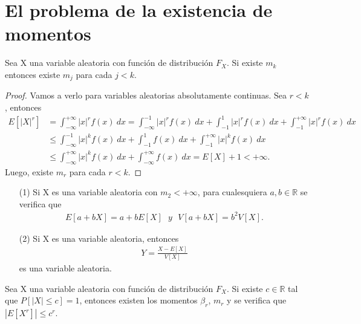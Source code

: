 \section{El problema de la existencia de momentos}

\begin{teo}
    Sea X una variable aleatoria con función de distribución $F_X$. Si existe $m_k$ entonces existe $m_j$ para cada $j < k$.
\end{teo}

\begin{proof}
    Vamos a verlo para variables aleatorias absolutamente continuas. Sea $r < k$, entonces
    \begin{align*}
        E[|X|^r] & = \int_{-\infty}^{+\infty}{|x|^rf(x) \ dx} = \int_{-\infty}^{-1}{|x|^rf(x) \ dx} + \int_{-1}^{1}{|x|^rf(x) \ dx} + \int_{-1}^{+\infty}{|x|^rf(x) \ dx} \\
                 & \leq \int_{-\infty}^{-1}{|x|^kf(x) \ dx} + \int_{-1}^{1}{f(x) \ dx} + \int_{-1}^{+\infty}{|x|^kf(x) \ dx}                                              \\
                 & \leq \int_{-\infty}^{+\infty}{|x|^kf(x) \ dx} + \int_{-\infty}^{+\infty}{f(x) \ dx} = E[X] + 1 < +\infty.
    \end{align*}
    Luego, existe $m_r$ para cada $r < k$.
\end{proof}

\begin{cor}
    \begin{enumerate}
        \item[(1)] Si X es una variable aleatoria con $m_2 < +\infty$, para cualesquiera $a,b \in \mathbb{R}$ se verifica que
              \begin{align*}
                  E[a + bX] = a + bE[X] \ \ \ y \ \ \ V[a + bX] = b^2V[X].
              \end{align*}
        \item[(2)] Si X es una variable aleatoria, entonces
              \begin{align*}
                  Y = \frac{X - E[X]}{V[X]}
              \end{align*}
              es una variable aleatoria.
    \end{enumerate}
\end{cor}

\begin{prop}
    Sea X una variable aleatoria con función de distribución $F_X$. Si existe $c \in \mathbb{R}$ tal que $P[|X| \leq c] = 1$, entonces existen los momentos $\beta_r$, $m_r$ y se verifica que $|E[X^r]| \leq c^r$.
\end{prop}

